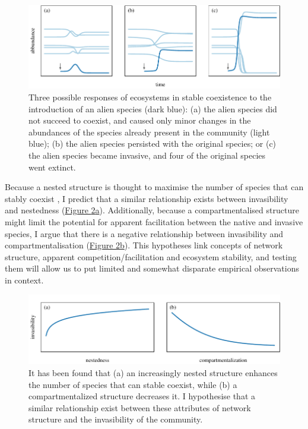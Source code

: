 \documentclass[a4paper]{article}
\begin{document}
\begin{figure}[tbp]
  \includegraphics{dynamics}
  \caption{
  \label{fig:dynamics}
  Three possible responses of ecosystems in stable coexistence to the introduction of an alien species (dark blue):
  (a) the alien species did not succeed to coexist, and caused only minor changes in the abundances of the species already present in the community (light blue);
  (b) the alien species persisted with the original species; or
  (c) the alien species became invasive, and four of the original species went extinct.
  }
\end{figure}

Because a nested structure is thought to maximise the number of species that can stably coexist \autocite{Bastolla2009}, I predict that a similar relationship exists between invasibility and nestedness (\hyperref[fig:hypo_c1]{Figure \ref{fig:hypo_c1}a}).
Additionally, because a compartmentalised structure might limit the potential for apparent facilitation between the native and invasive species, I argue that there is a negative relationship between invasibility and compartmentalisation (\hyperref[fig:hypo_c1]{Figure \ref{fig:hypo_c1}b}).
This hypotheses link concepts of network structure, apparent competition/facilitation and ecosystem stability, and testing them will allow us to put limited and somewhat disparate empirical observations in context.

\begin{figure}[tbp]
  \includegraphics{hypo_c1}
  \caption{
  \label{fig:hypo_c1}
  It has been found that (a) an increasingly nested structure enhances the number of species that can stable coexist, while (b) a compartmentalized structure decreases it.
  I hypothesise that a similar relationship exist between these attributes of network structure and the invasibility of the community.
  }
\end{figure}
\end{document}
